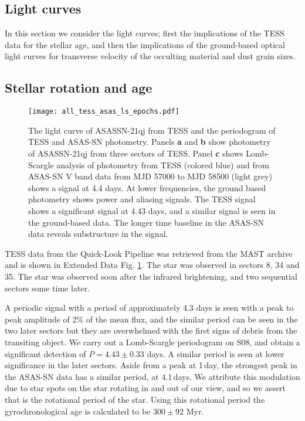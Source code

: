 \documentclass[sn-nature]{sn-jnl}%
\begin{document}
\subsection*{Light curves}

In this section we consider the light curves; first the implications of the TESS data for the stellar age, and then the implications of the ground-based optical light curves for transverse velocity of the occulting material and dust grain sizes.

\subsection*{Stellar rotation and age}

\begin{figure}
   \begin{centering}
   \texttt{[image: all\_tess\_asas\_ls\_epochs.pdf]}
      \caption{The light curve of ASASSN-21qj from TESS and the periodogram of TESS and ASAS-SN photometry.
      Panels {\bf a} and {\bf b} show photometry of ASASSN-21qj from three sectors of TESS.
      Panel {\bf c} shows Lomb-Scargle analysis of photometry from TESS (colored blue) and from ASAS-SN V band data from MJD 57000 to MJD 58500 (light grey) shows a signal at 4.4 days.
      At lower frequencies, the ground based photometry shows power and aliasing signals.
      The TESS signal shows a significant signal at 4.43 days, and a similar signal is seen in the ground-based data.
      The longer time baseline in the ASAS-SN data reveals substructure in the signal.}
        \label{fig:TESS_lc}
    \end{centering}
\end{figure}

TESS data from the Quick-Look Pipeline \cite{2020RNAAS...4..204H,2021RNAAS...5..234K} was retrieved from the MAST archive and is shown in Extended Data Fig. \ref{fig:TESS_lc}.
%
The star was observed in sectors 8, 34 and 35.
%
The star was observed soon after the infrared brightening, and two sequential sectors some time later.

A periodic signal with a period of approximately 4.3 days is seen with a peak to peak amplitude of 2\% of the mean flux, and the similar period can be seen in the two later sectors but they are overwhelmed with the first signs of debris from the transiting object.
%
We carry out a Lomb-Scargle periodogram on S08, and obtain a significant detection of $P=4.43\pm 0.33$ days.
%
A similar period is seen at lower significance in the later sectors.
%
Aside from a peak at 1\,day, the  strongest peak in the ASAS-SN data has a similar period, at 4.1\,days.
%
We attribute this modulation due to star spots on the star rotating in and out of our view, and so we assert that is the rotational period of the star.
%
Using this rotational period the gyrochronological age \cite{Bouma23,Kounkel22} is calculated to be $300\pm92$ Myr.
\end{document}
